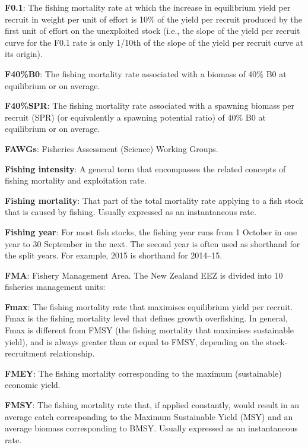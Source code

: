 \documentclass{mpi-plenary}
\theoremstyle{definition}
\theoremstyle{definition}
\theoremstyle{definition}
\theoremstyle{remark}
\begin{document}
\protect\hypertarget{def-f0.1}{}{} \textbf{F0.1}: The fishing mortality
rate at which the increase in equilibrium yield per recruit in weight
per unit of effort is 10\% of the yield per recruit produced by the
first unit of effort on the unexploited stock (i.e., the slope of the
yield per recruit curve for the F0.1 rate is only 1/10th of the slope of
the yield per recruit curve at its origin).

\protect\hypertarget{def-f40b0}{}{} \textbf{F40\%B0}: The fishing
mortality rate associated with a biomass of 40\% B0 at equilibrium or on
average.

\protect\hypertarget{def-f40spr}{}{} \textbf{F40\%SPR}: The fishing
mortality rate associated with a spawning biomass per recruit (SPR) (or
equivalently a spawning potential ratio) of 40\% B0 at equilibrium or on
average.

\protect\hypertarget{def-fawgs}{}{} \textbf{FAWGs}: Fisheries Assessment
(Science) Working Groups.

\protect\hypertarget{def-fishing-intensity}{}{} \textbf{Fishing
intensity}: A general term that encompasses the related concepts of
fishing mortality and exploitation rate.

\protect\hypertarget{def-fishing-mortality}{}{} \textbf{Fishing
mortality}: That part of the total mortality rate applying to a fish
stock that is caused by fishing. Usually expressed as an instantaneous
rate.

\protect\hypertarget{def-fishing-year}{}{} \textbf{Fishing year}: For
most fish stocks, the fishing year runs from 1 October in one year to 30
September in the next. The second year is often used as shorthand for
the split years. For example, 2015 is shorthand for 2014--15.

\protect\hypertarget{def-fma}{}{} \textbf{FMA}: Fishery Management Area.
The New Zealand EEZ is divided into 10 fisheries management units:

\protect\hypertarget{def-fmax}{}{} \textbf{Fmax}: The fishing mortality
rate that maximises equilibrium yield per recruit. Fmax is the fishing
mortality level that defines growth overfishing. In general, Fmax is
different from FMSY (the fishing mortality that maximises sustainable
yield), and is always greater than or equal to FMSY, depending on the
stock-recruitment relationship.

\protect\hypertarget{def-fmey}{}{} \textbf{FMEY}: The fishing mortality
corresponding to the maximum (sustainable) economic yield.

\protect\hypertarget{def-fmsy}{}{} \textbf{FMSY}: The fishing mortality
rate that, if applied constantly, would result in an average catch
corresponding to the Maximum Sustainable Yield (MSY) and an average
biomass corresponding to BMSY. Usually expressed as an instantaneous
rate.
\end{document}
